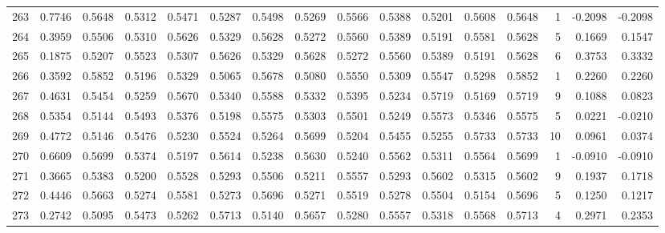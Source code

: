 \begin{tabular}{lrrrrrrrrrrrrrrr}
263 &      0.7746 &  0.5648 &  0.5312 &  0.5471 &  0.5287 &  0.5498 &  0.5269 &  0.5566 &  0.5388 &  0.5201 &   0.5608 &     0.5648 &      1 &                   -0.2098 &                    -0.2098 \\
264 &      0.3959 &  0.5506 &  0.5310 &  0.5626 &  0.5329 &  0.5628 &  0.5272 &  0.5560 &  0.5389 &  0.5191 &   0.5581 &     0.5628 &      5 &                    0.1669 &                     0.1547 \\
265 &      0.1875 &  0.5207 &  0.5523 &  0.5307 &  0.5626 &  0.5329 &  0.5628 &  0.5272 &  0.5560 &  0.5389 &   0.5191 &     0.5628 &      6 &                    0.3753 &                     0.3332 \\
266 &      0.3592 &  0.5852 &  0.5196 &  0.5329 &  0.5065 &  0.5678 &  0.5080 &  0.5550 &  0.5309 &  0.5547 &   0.5298 &     0.5852 &      1 &                    0.2260 &                     0.2260 \\
267 &      0.4631 &  0.5454 &  0.5259 &  0.5670 &  0.5340 &  0.5588 &  0.5332 &  0.5395 &  0.5234 &  0.5719 &   0.5169 &     0.5719 &      9 &                    0.1088 &                     0.0823 \\
268 &      0.5354 &  0.5144 &  0.5493 &  0.5376 &  0.5198 &  0.5575 &  0.5303 &  0.5501 &  0.5249 &  0.5573 &   0.5346 &     0.5575 &      5 &                    0.0221 &                    -0.0210 \\
269 &      0.4772 &  0.5146 &  0.5476 &  0.5230 &  0.5524 &  0.5264 &  0.5699 &  0.5204 &  0.5455 &  0.5255 &   0.5733 &     0.5733 &     10 &                    0.0961 &                     0.0374 \\
270 &      0.6609 &  0.5699 &  0.5374 &  0.5197 &  0.5614 &  0.5238 &  0.5630 &  0.5240 &  0.5562 &  0.5311 &   0.5564 &     0.5699 &      1 &                   -0.0910 &                    -0.0910 \\
271 &      0.3665 &  0.5383 &  0.5200 &  0.5528 &  0.5293 &  0.5506 &  0.5211 &  0.5557 &  0.5293 &  0.5602 &   0.5315 &     0.5602 &      9 &                    0.1937 &                     0.1718 \\
272 &      0.4446 &  0.5663 &  0.5274 &  0.5581 &  0.5273 &  0.5696 &  0.5271 &  0.5519 &  0.5278 &  0.5504 &   0.5154 &     0.5696 &      5 &                    0.1250 &                     0.1217 \\
273 &      0.2742 &  0.5095 &  0.5473 &  0.5262 &  0.5713 &  0.5140 &  0.5657 &  0.5280 &  0.5557 &  0.5318 &   0.5568 &     0.5713 &      4 &                    0.2971 &                     0.2353 \\

\end{tabular}
